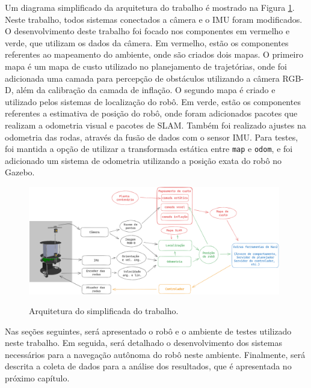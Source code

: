 \documentclass[repeatfields,xlists,xpacks,oneside,yearsonly]{ufrgscca}
\begin{document}
Um diagrama simplificado da arquitetura do trabalho é mostrado na
Figura \ref{fig:arq_trabalho}.
Neste trabalho, todos sistemas conectados a câmera e o IMU foram modificados.
O desenvolvimento deste trabalho foi focado nos componentes em vermelho
e verde, que utilizam os dados da câmera.
Em vermelho, estão os componentes referentes ao mapeamento do ambiente,
onde são criados dois mapas.
O primeiro mapa é um mapa de custo utilizado no planejamento de trajetórias,
onde foi adicionada uma camada para percepção de obstáculos utilizando
a câmera RGB-D, além da calibração da camada de inflação.
O segundo mapa é criado e utilizado pelos sistemas de localização do robô.
Em verde, estão os componentes referentes a estimativa de
posição do robô, onde foram adicionados pacotes que realizam a
odometria visual e pacotes de SLAM.
Também foi realizado ajustes na odometria das rodas, através da fusão
de dados com o sensor IMU.
Para testes, foi mantida a opção de utilizar a transformada estática entre
\texttt{map} e \texttt{odom}, e foi adicionado um sistema de odometria
utilizando a posição exata do robô no Gazebo.

\begin{figure}[h]
    {
        \centering
        \caption{Arquitetura do simplificada do trabalho.}
        \label{fig:arq_trabalho}
        \includegraphics[width=0.98\textwidth]{arquitetura_simplificadav3.png}\\
    }
\end{figure}

Nas seções seguintes, será apresentado o robô e o ambiente de testes
utilizado neste trabalho.
Em seguida, será detalhado o desenvolvimento dos sistemas necessários
para a navegação autônoma do robô neste ambiente.
Finalmente, será descrita a coleta de dados para a análise dos resultados,
que é apresentada no próximo capítulo.
\end{document}

